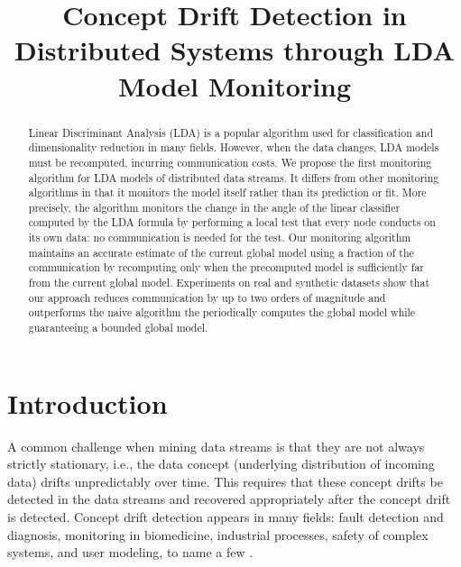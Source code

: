 \documentclass[11pt,twocolumn,varwidth=true,a4paper,fleqn]{article}
\begin{document}
\nocite{*}

\title{Concept Drift Detection in Distributed Systems through LDA
Model Monitoring}
\date{}
\maketitle

\begin{abstract}
Linear Discriminant Analysis (LDA) is a popular algorithm used for
classification and dimensionality reduction in many fields. 
However, when the data changes, LDA models must be recomputed, incurring 
communication costs. 
We propose the first monitoring algorithm for LDA
models of distributed data streams. 
It differs from other monitoring algorithms in that it monitors the model itself
rather than its prediction or fit.
More precisely, the algorithm monitors the change in the angle of the linear
classifier computed by the LDA formula by performing a local test that every node
conducts on its own data: no communication is needed for the test.
Our monitoring algorithm maintains an accurate estimate of the current global
model using a fraction of the communication by recomputing only when the
precomputed model is sufficiently far from the current global model. 
Experiments on real and synthetic datasets show that
our approach reduces communication by up to two orders
of magnitude and outperforms the naive algorithm the periodically computes the
global model while guaranteeing a bounded global model.
\end{abstract}

\section{Introduction}
A common challenge when mining data streams is that
they are not always strictly stationary, i.e., the data
concept (underlying distribution of incoming data) drifts 
unpredictably over time. This requires that these concept drifts be detected 
in the data streams and recovered appropriately after the concept drift 
is detected. 
Concept drift detection appears in many fields: fault detection and
diagnosis, monitoring in biomedicine, industrial processes,  
safety of complex systems, and user modeling, to name a few
\cite{basseville1993detection}.
\end{document}
